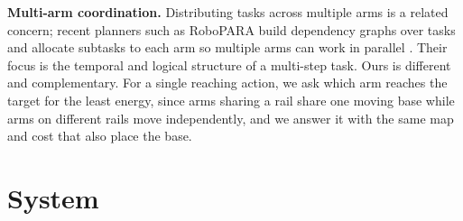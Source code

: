 \documentclass[conference]{IEEEtran}
\begin{document}
\noindent\textbf{Multi-arm coordination.}
Distributing tasks across multiple arms is a related concern; recent
planners such as RoboPARA build dependency graphs over tasks and
allocate subtasks to each arm so multiple arms can work in parallel
\cite{RoboPARA2026}. Their focus is the temporal and logical structure of
a multi-step task. Ours is different and complementary. For a single reaching action,
we ask which arm reaches the target for the least energy, since arms sharing a rail share
one moving base while arms on different rails move independently, and we answer it
with the same map and cost that also place the base.

\section{System}
\end{document}
